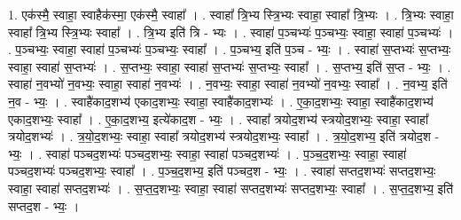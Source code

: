 \documentclass[17pt]{extarticle}
\begin{document}
1. एक॑स्मै॒ स्वाहा॒ स्वाहैक॑स्मा॒ एक॑स्मै॒ स्वाहा᳚ । . स्वाहा᳚ त्रि॒भ्य स्त्रि॒भ्यः स्वाहा॒ स्वाहा᳚ त्रि॒भ्यः । . त्रि॒भ्यः स्वाहा॒ स्वाहा᳚ त्रि॒भ्य स्त्रि॒भ्यः स्वाहा᳚ । . त्रि॒भ्य इति॑ त्रि - भ्यः । . स्वाहा॑ प॒ञ्चभ्यः॑ प॒ञ्चभ्यः॒ स्वाहा॒ स्वाहा॑ प॒ञ्चभ्यः॑ । . प॒ञ्चभ्यः॒ स्वाहा॒ स्वाहा॑ प॒ञ्चभ्यः॑ प॒ञ्चभ्यः॒ स्वाहा᳚ । . प॒ञ्चभ्य॒ इति॑ प॒ञ्च - भ्यः॒ । . स्वाहा॑ स॒प्तभ्यः॑ स॒प्तभ्यः॒ स्वाहा॒ स्वाहा॑ स॒प्तभ्यः॑ । . स॒प्तभ्यः॒ स्वाहा॒ स्वाहा॑ स॒प्तभ्यः॑ स॒प्तभ्यः॒ स्वाहा᳚ । . स॒प्तभ्य॒ इति॑ स॒प्त - भ्यः॒ । . स्वाहा॑ न॒वभ्यो॑ न॒वभ्यः॒ स्वाहा॒ स्वाहा॑ न॒वभ्यः॑ । . न॒वभ्यः॒ स्वाहा॒ स्वाहा॑ न॒वभ्यो॑ न॒वभ्यः॒ स्वाहा᳚ । . न॒वभ्य॒ इति॑ न॒व - भ्यः॒ । . स्वाहै॑काद॒शभ्य॑ एकाद॒शभ्यः॒ स्वाहा॒ स्वाहै॑काद॒शभ्यः॑ । . ए॒का॒द॒शभ्यः॒ स्वाहा॒ स्वाहै॑काद॒शभ्य॑ एकाद॒शभ्यः॒ स्वाहा᳚ । . ए॒का॒द॒शभ्य॒ इत्ये॑काद॒श - भ्यः॒ । . स्वाहा᳚ त्रयोद॒शभ्य॑ स्त्रयोद॒शभ्यः॒ स्वाहा॒ स्वाहा᳚ त्रयोद॒शभ्यः॑ । . त्र॒यो॒द॒शभ्यः॒ स्वाहा॒ स्वाहा᳚ त्रयोद॒शभ्य॑ स्त्रयोद॒शभ्यः॒ स्वाहा᳚ । . त्र॒यो॒द॒शभ्य॒ इति॑ त्रयोद॒श - भ्यः॒ । . स्वाहा॑ पञ्चद॒शभ्यः॑ पञ्चद॒शभ्यः॒ स्वाहा॒ स्वाहा॑ पञ्चद॒शभ्यः॑ । . प॒ञ्च॒द॒शभ्यः॒ स्वाहा॒ स्वाहा॑ पञ्चद॒शभ्यः॑ पञ्चद॒शभ्यः॒ स्वाहा᳚ । . प॒ञ्च॒द॒शभ्य॒ इति॑ पञ्चद॒श - भ्यः॒ । . स्वाहा॑ सप्तद॒शभ्यः॑ सप्तद॒शभ्यः॒ स्वाहा॒ स्वाहा॑ सप्तद॒शभ्यः॑ । . स॒प्त॒द॒शभ्यः॒ स्वाहा॒ स्वाहा॑ सप्तद॒शभ्यः॑ सप्तद॒शभ्यः॒ स्वाहा᳚ । . स॒प्त॒द॒शभ्य॒ इति॑ सप्तद॒श - भ्यः॒ । \newline
\end{document}
